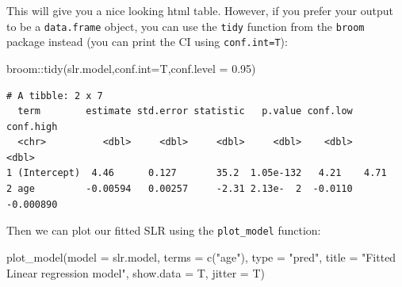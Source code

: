 \documentclass[
  letterpaper,
  DIV=11,
  numbers=noendperiod]{scrartcl}
\newenvironment{Shaded}{\begin{snugshade}}{\end{snugshade}}
\newcommand{\AttributeTok}[1]{\textcolor[rgb]{0.40,0.45,0.13}{#1}}
\newcommand{\FloatTok}[1]{\textcolor[rgb]{0.68,0.00,0.00}{#1}}
\newcommand{\FunctionTok}[1]{\textcolor[rgb]{0.28,0.35,0.67}{#1}}
\newcommand{\NormalTok}[1]{\textcolor[rgb]{0.00,0.23,0.31}{#1}}
\newcommand{\SpecialCharTok}[1]{\textcolor[rgb]{0.37,0.37,0.37}{#1}}
\newcommand{\StringTok}[1]{\textcolor[rgb]{0.13,0.47,0.30}{#1}}
\begin{document}
This will give you a nice looking html table. However, if you prefer
your output to be a \texttt{data.frame} object, you can use the
\texttt{tidy} function from the \texttt{broom} package instead (you can
print the CI using \texttt{conf.int=T}):

\begin{Shaded}
\begin{Highlighting}[]
\NormalTok{broom}\SpecialCharTok{::}\FunctionTok{tidy}\NormalTok{(slr.model,}\AttributeTok{conf.int=}\NormalTok{T,}\AttributeTok{conf.level =} \FloatTok{0.95}\NormalTok{)}
\end{Highlighting}
\end{Shaded}

\begin{verbatim}
# A tibble: 2 x 7
  term        estimate std.error statistic   p.value conf.low conf.high
  <chr>          <dbl>     <dbl>     <dbl>     <dbl>    <dbl>     <dbl>
1 (Intercept)  4.46      0.127       35.2  1.05e-132   4.21    4.71    
2 age         -0.00594   0.00257     -2.31 2.13e-  2  -0.0110 -0.000890
\end{verbatim}

Then we can plot our fitted SLR using the \texttt{plot\_model} function:

\begin{Shaded}
\begin{Highlighting}[]
\FunctionTok{plot\_model}\NormalTok{(}\AttributeTok{model =}\NormalTok{ slr.model,}
           \AttributeTok{terms =} \FunctionTok{c}\NormalTok{(}\StringTok{"age"}\NormalTok{),}
           \AttributeTok{type  =} \StringTok{"pred"}\NormalTok{,}
           \AttributeTok{title =} \StringTok{"Fitted Linear regression model"}\NormalTok{,}
           \AttributeTok{show.data =}\NormalTok{ T,}
           \AttributeTok{jitter =}\NormalTok{ T)}
\end{Highlighting}
\end{Shaded}
\end{document}
